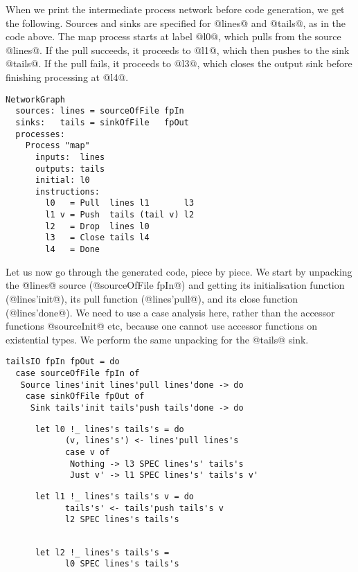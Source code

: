 When we print the intermediate process network before code generation, we get the following.
Sources and sinks are specified for @lines@ and @tails@, as in the code above.
The map process starts at label @l0@, which pulls from the source @lines@.
If the pull succeeds, it proceeds to @l1@, which then pushes to the sink @tails@.
If the pull fails, it proceeds to @l3@, which closes the output sink before finishing processing at @l4@.

\begin{lstlisting}
NetworkGraph
  sources: lines = sourceOfFile fpIn
  sinks:   tails = sinkOfFile   fpOut
  processes:
    Process "map"
      inputs:  lines
      outputs: tails
      initial: l0
      instructions:
        l0   = Pull  lines l1       l3
        l1 v = Push  tails (tail v) l2
        l2   = Drop  lines l0
        l3   = Close tails l4
        l4   = Done
\end{lstlisting}

Let us now go through the generated code, piece by piece.
We start by unpacking the @lines@ source (@sourceOfFile fpIn@) and getting its initialisation function (@lines'init@), its pull function (@lines'pull@), and its close function (@lines'done@).
We need to use a case analysis here, rather than the accessor functions @sourceInit@ etc, because one cannot use accessor functions on existential types.
We perform the same unpacking for the @tails@ sink.

\begin{lstlisting}
tailsIO fpIn fpOut = do
  case sourceOfFile fpIn of
   Source lines'init lines'pull lines'done -> do
    case sinkOfFile fpOut of
     Sink tails'init tails'push tails'done -> do
\end{lstlisting}

\begin{lstlisting}
      let l0 !_ lines's tails's = do
            (v, lines's') <- lines'pull lines's
            case v of
             Nothing -> l3 SPEC lines's' tails's
             Just v' -> l1 SPEC lines's' tails's v'
\end{lstlisting}

\begin{lstlisting}
      let l1 !_ lines's tails's v = do
            tails's' <- tails'push tails's v
            l2 SPEC lines's tails's
\end{lstlisting}

\begin{lstlisting}

      let l2 !_ lines's tails's =
            l0 SPEC lines's tails's
\end{lstlisting}

